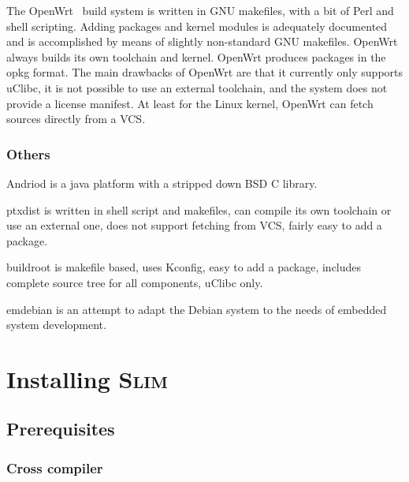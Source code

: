 \documentclass[a4paper,10pt]{article}
\newenvironment{Description}[1][\quad]{%
  \begin{list}{}{%
      \renewcommand{\makelabel}[1]{\textbf{##1}\hfill}%
      \settowidth{\labelwidth}{\textbf{#1}}%
      \setlength{\leftmargin}{\labelwidth+\labelsep}%
  }%
}{%
  \end{list}%
}
\newcommand{\slim}{\textsc{Slim}\xspace}
\begin{document}
    The OpenWrt~\cite{openwrt} build system is written in GNU
    makefiles, with a bit of Perl and shell scripting. Adding packages
    and kernel modules is adequately documented and is accomplished by
    means of slightly non-standard GNU makefiles. OpenWrt always
    builds its own toolchain and kernel. OpenWrt produces packages in
    the opkg format. The main drawbacks of OpenWrt are that it
    currently only supports uClibc, it is not possible to use an
    external toolchain, and the system does not provide a license
    manifest. At least for the Linux kernel, OpenWrt can fetch sources
    directly from a VCS.

\subsubsection{Others}

\begin{Description}[buildroot0000]

\item[Andriod]
  is a java platform with a stripped down BSD C library.

\item[ptxdist \cite{ptxdist}]
  is written in shell script and makefiles, can compile its own
  toolchain or use an external one, does not support fetching from
  VCS, fairly easy to add a package.

\item[buildroot \cite{buildroot}]
  is makefile based, uses Kconfig, easy to add a package, includes
  complete source tree for all components, uClibc only.

\item[emdebian \cite{emdebian}]
  is an attempt to adapt the Debian system to the needs of embedded
  system development.

\end{Description}

\section{Installing \slim}

\subsection{Prerequisites}

\subsubsection{Cross compiler}
\end{document}
